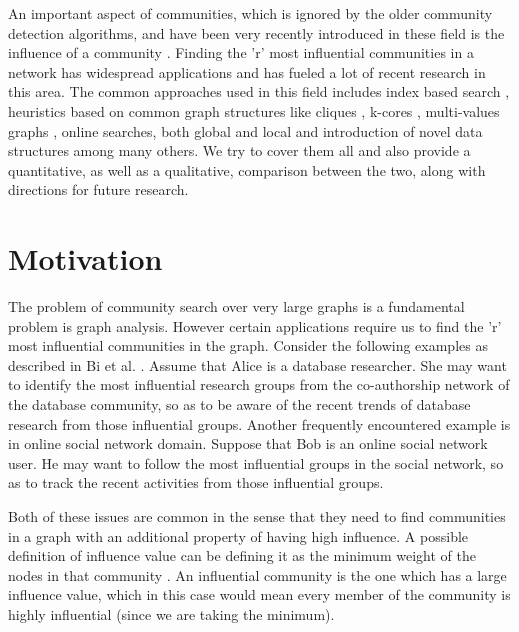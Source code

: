 \documentclass[conference]{IEEEtran}
\begin{document}
An important aspect of communities, which is ignored by the older community detection algorithms, and have been very recently introduced in these field is the influence of a community \cite{Li:2015:ICS:2735479.2735484}. Finding the 'r' most influential communities in a network has widespread applications and has fueled a lot of recent research in this area. The common approaches used in this field includes index based search \cite{Li:2015:ICS:2735479.2735484}, heuristics based on common graph structures like cliques \cite{unknown}, k-cores \cite{Li:2017:FIC:3159176.3159197}, multi-values graphs \cite{Li:2018:SCS:3183713.3183736}, online searches, both global \cite{Li:2015:ICS:2735479.2735484} and local \cite{Bi:2018:OPA:3213880.3232249} and introduction of novel data structures \cite{Li:2017:FIC:3159176.3159197} among many others. We try to cover them all and also provide a quantitative, as well as a qualitative, comparison between the two, along with directions for future research.

\section{Motivation}

The problem of community search over very large graphs is a fundamental problem is graph analysis. However certain applications require us to find the 'r' most influential communities in the graph. Consider the following examples as described in Bi et al. \cite{Bi:2018:OPA:3213880.3232249}. Assume that Alice is a database researcher. She may want to identify the most influential research groups from the co-authorship network of the database community, so as to be aware of the recent trends of database research from those influential groups. Another frequently encountered example is in online social network domain. Suppose that Bob is an online social network user. He may want to follow the most influential groups in the social network, so as to track the recent activities from those influential groups. 

Both of these issues are common in the sense that they need to find communities in a graph with an additional property of having high influence. A possible definition of influence value can be defining it as the minimum weight of the nodes in that community \cite{Li:2015:ICS:2735479.2735484}. An influential community is the one which has a large influence value, which in this case would mean every member of the community is highly influential (since we are taking the minimum).
\end{document}

